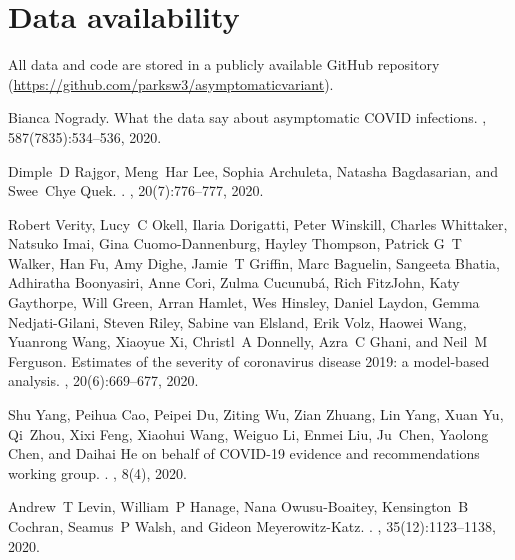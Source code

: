 \documentclass[12pt]{article}
\begin{document}
\section*{Data availability}

All data and code are stored in a publicly available GitHub repository (\url{https://github.com/parksw3/asymptomaticvariant}).

\pagebreak

\begin{thebibliography}{10}

Bianca Nogrady.
\newblock What the data say about asymptomatic {COVID} infections.
, 587(7835):534--536, 2020.

Dimple~D Rajgor, Meng~Har Lee, Sophia Archuleta, Natasha Bagdasarian, and
  Swee~Chye Quek.
.
, 20(7):776--777, 2020.

Robert Verity, Lucy~C Okell, Ilaria Dorigatti, Peter Winskill, Charles
  Whittaker, Natsuko Imai, Gina Cuomo-Dannenburg, Hayley Thompson, Patrick G~T
  Walker, Han Fu, Amy Dighe, Jamie~T Griffin, Marc Baguelin, Sangeeta Bhatia,
  Adhiratha Boonyasiri, Anne Cori, Zulma Cucunubá, Rich FitzJohn, Katy
  Gaythorpe, Will Green, Arran Hamlet, Wes Hinsley, Daniel Laydon, Gemma
  Nedjati-Gilani, Steven Riley, Sabine {van Elsland}, Erik Volz, Haowei Wang,
  Yuanrong Wang, Xiaoyue Xi, Christl~A Donnelly, Azra~C Ghani, and Neil~M
  Ferguson.
\newblock Estimates of the severity of coronavirus disease 2019: a model-based
  analysis.
, 20(6):669--677, 2020.

Shu Yang, Peihua Cao, Peipei Du, Ziting Wu, Zian Zhuang, Lin Yang, Xuan Yu,
  Qi~Zhou, Xixi Feng, Xiaohui Wang, Weiguo Li, Enmei Liu, Ju~Chen, Yaolong
  Chen, and {Daihai He on behalf of COVID-19 evidence and recommendations
  working group}.
.
, 8(4), 2020.

Andrew~T Levin, William~P Hanage, Nana Owusu-Boaitey, Kensington~B Cochran,
  Seamus~P Walsh, and Gideon Meyerowitz-Katz.
.
, 35(12):1123--1138, 2020.


\end{thebibliography}
\end{document}
